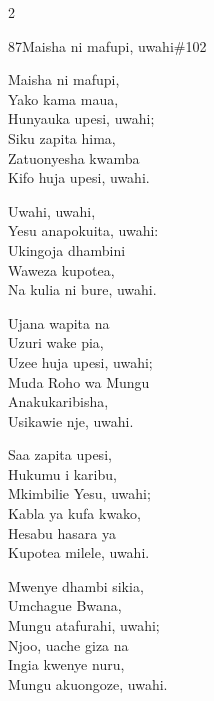 \begin{multicols}{2}
\begin{hymn}{87}{Maisha ni mafupi, uwahi}{\#102}
\begin{stanza}
Maisha ni mafupi,\\
Yako kama maua,\\
Hunyauka upesi, uwahi;\\
Siku zapita hima,\\
Zatuonyesha kwamba\\
Kifo huja upesi, uwahi.
\end{stanza}
\begin{chorus}
Uwahi, uwahi,\\
Yesu anapokuita, uwahi:\\
Ukingoja dhambini\\
Waweza kupotea,\\
Na kulia ni bure, uwahi.
\end{chorus}
\begin{stanza}
Ujana wapita na\\
Uzuri wake pia,\\
Uzee huja upesi, uwahi;\\
Muda Roho wa Mungu\\
Anakukaribisha,\\
Usikawie nje, uwahi.
\end{stanza}
\begin{stanza}
Saa zapita upesi,\\
Hukumu i karibu,\\
Mkimbilie Yesu, uwahi;\\
Kabla ya kufa kwako,\\
Hesabu hasara ya\\
Kupotea milele, uwahi.
\end{stanza}
\begin{stanza}
Mwenye dhambi sikia,\\
Umchague Bwana,\\
Mungu atafurahi, uwahi;\\
Njoo, uache giza na\\
Ingia kwenye nuru,\\
Mungu akuongoze, uwahi.
\end{stanza}
\end{hymn}


\end{multicols}
